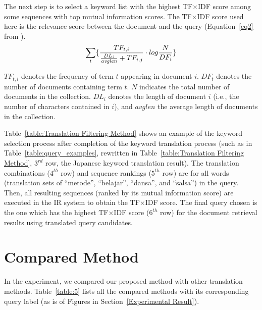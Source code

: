 \documentclass[english]{jnlp_1.3c}
\begin{document}
The next step
is to select a keyword list with the highest TF×IDF score among some
sequences with top mutual information scores. The TF×IDF score used
here is the relevance score between the document and the query
(Equation~\ref{eq2} from \cite{fujii2003}).
\begin{equation}
  \sum_t\{ \frac {TF_{t,i}}{{\frac{DL_i}{{\it avglen}} + TF_{i,j}}} \cdot
   log{\frac N{DF_i}}\}
    \label{eq2}
\end{equation}

$TF_{t,i}$ denotes the frequency of term $t$ appearing in document $i$.
$DF_t$ denotes the number of documents containing term $t$. $N$
indicates the total number of documents in the collection. $DL_{i}$
denotes the length of document $i$ (i.e., the number of characters
contained in $i$), and $\mathit{avglen}$ the average length of documents in the
collection.
 
Table~\ref{table:Translation Filtering Method} shows an example of the
keyword selection process after completion of the keyword translation
process (such as in Table~\ref{table:query_examples},
rewritten in Table~\ref{table:Translation Filtering Method}, $3^{rd}$ row,
the Japanese keyword translation result).  The translation combinations
($4^{th}$ row) and sequence rankings ($5^{th}$ row) are for all words 
(translation
sets of ``metode'', ``belajar'', ``dansa'', and ``salsa'') in the
query. Then, all resulting sequences (ranked by its mutual information
score) are executed in the IR system to obtain the TF×IDF score. The
final query chosen is the one which has the highest TF×IDF score ($6^{th}$
row) for the document retrieval results using translated query
candidates.


\section{Compared Method}
\label{Compared Method}
In the experiment, we compared our proposed method with other
translation methods. Table~\ref{table:5} lists all the compared methods
with its corresponding query label (as is of Figures in
Section~\ref{Experimental Result}).
\end{document}
